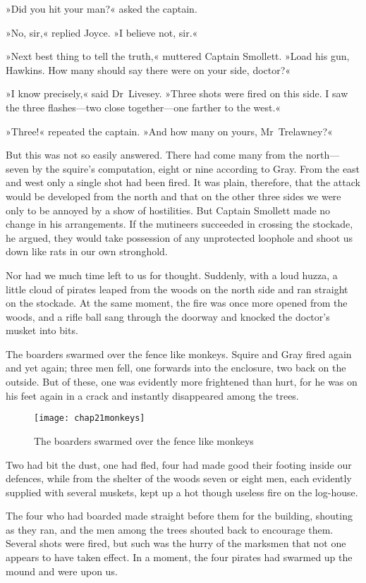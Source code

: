 »Did you hit your man?« asked the captain.

»No, sir,« replied Joyce. »I believe not, sir.«

»Next best thing to tell the truth,« muttered Captain Smollett. »Load his gun, Hawkins. How many should say there were on your side, doctor?«

»I know precisely,« said Dr~Livesey. »Three shots were fired on this side. I saw the three flashes—two close together—one farther to the west.«

»Three!« repeated the captain. »And how many on yours, Mr~Trelawney?«

But this was not so easily answered. There had come many from the north—seven by the squire's computation, eight or nine according to Gray. From the east and west only a single shot had been fired. It was plain, therefore, that the attack would be developed from the north and that on the other three sides we were only to be annoyed by a show of hostilities. But Captain Smollett made no change in his arrangements. If the mutineers succeeded in crossing the stockade, he argued, they would take possession of any unprotected loophole and shoot us down like rats in our own stronghold.

Nor had we much time left to us for thought. Suddenly, with a loud huzza, a little cloud of pirates leaped from the woods on the north side and ran straight on the stockade. At the same moment, the fire was once more opened from the woods, and a rifle ball sang through the doorway and knocked the doctor's musket into bits.

The boarders swarmed over the fence like monkeys. Squire and Gray fired again and yet again; three men fell, one forwards into the enclosure, two back on the outside. But of these, one was evidently more frightened than hurt, for he was on his feet again in a crack and instantly disappeared among the trees.

  \begin{sidewaysfigure}
\texttt{[image: chap21monkeys]}%
\caption{The boarders swarmed over the fence like monkeys}
\end{sidewaysfigure} 

Two had bit the dust, one had fled, four had made good their footing inside our defences, while from the shelter of the woods seven or eight men, each evidently supplied with several muskets, kept up a hot though useless fire on the log-house.

The four who had boarded made straight before them for the building, shouting as they ran, and the men among the trees shouted back to encourage them. Several shots were fired, but such was the hurry of the marksmen that not one appears to have taken effect. In a moment, the four pirates had swarmed up the mound and were upon us.

